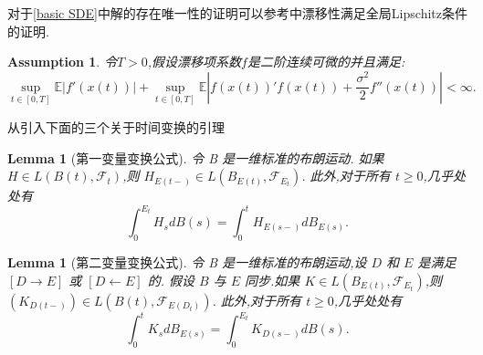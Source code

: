 \documentclass[12pt,final]{article}
\theoremstyle{plain}
\newtheorem{Lemma}[Theorem]{Lemma}      %
\newtheorem{Assumption}[Theorem]{Assumption} %
\theoremstyle{Definition}
\theoremstyle{Remark}
\begin{document}
	对于\cref{basic SDE}中解的存在唯一性的证明可以参考\cite{umarov2018beyond}中漂移性满足全局Lipschitz条件的证明.
	\begin{Assumption}\label{assum3}
		令$T>0$,假设漂移项系数$f$是二阶连续可微的并且满足:
		\begin{equation}
			\sup\limits_{t\in[0,T]}\mathbb{E}\left|f'(x(t))\right|+
			\sup\limits_{t\in[0,T]}\mathbb{E}\left|f(x(t))'f(x(t))+
			\frac{\sigma^2}2f''(x(t))\right|<\infty.
		\end{equation}
	\end{Assumption}
	
%		
	
	从\cite{umarov2018beyond}引入下面的三个关于时间变换的引理
	\begin{Lemma}[第一变量变换公式]\label{first}
		令 B 是一维标准的布朗运动.
		如果 $H \in L(B(t), \mathcal{F}_t)$,则 $H_{E(t-)} \in L(B_{E(t)}, \mathcal{F}_{E_t})$.
		此外,对于所有 $t \geqslant 0$,几乎处处有
		$$
		\int_0^{E_t} H_s dB(s) = \int_0^t H_{E(s-)} dB_{E(s)}.
		$$
	\end{Lemma}
	\begin{Lemma}[第二变量变换公式]\label{second}
		令 B 是一维标准的布朗运动,设 $D$ 和 $E$ 是满足 $[D \longrightarrow E]$ 或 $[D \longleftarrow E]$ 的.
		假设 $B$ 与 $E$ 同步.如果 $K \in L(B_{E(t)}, \mathcal{F}_{E_t})$,则 $(K_{D(t-)}) \in L(B(t), \mathcal{F}_{E(D_t)})$.
		此外,对于所有 $t \geqslant 0$,几乎处处有
		$$
		\int_0^t K_s dB_{E(s)} = \int_0^{E_t} K_{D(s-)} dB(s).
		$$
	\end{Lemma}
	
\end{document}
